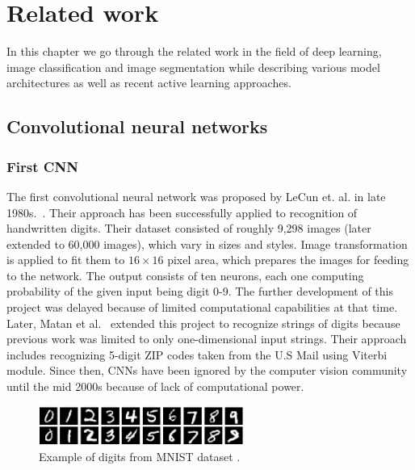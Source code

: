 \chapter{Related work}
\label{chapter:related_work}

In this chapter we go through the related work in the field of deep learning, image classification
and image segmentation while describing various model architectures as well as recent
active learning approaches.

\section{Convolutional neural networks}
\label{sec:cnn_rw}

\subsection{First CNN}
\label{sec:cnn_rw:lecun}

The first convolutional neural network was proposed by LeCun et.
al. in late 1980s.~\cite{bib:lecun1989backpropagation}. Their approach has been
successfully applied to recognition of handwritten digits. Their dataset \cite{bib:lecun2010mnist}
consisted of roughly 9,298 images (later extended to 60,000 images),
which vary in sizes and styles. Image transformation
is applied to fit them to $16\times16$ pixel area, which prepares the images for feeding to the
network. The output consists of ten neurons, each one computing probability
of the given input being digit 0-9. The further development of this project was delayed
because of limited computational capabilities at that time.
Later, Matan et al.~\cite{bib:matan1992multi} extended this project to recognize
strings of digits because previous work was limited to only one-dimensional
input strings. Their approach includes recognizing 5-digit ZIP codes taken from
the U.S Mail using Viterbi module.
Since then, CNNs have been ignored by the computer vision community until the mid 2000s
because of lack of computational power.

\begin{figure}[h]
	\centerline{\includegraphics[width=0.6\textwidth]{images/mnist_example.png}}
	\caption[Example of digits from MNIST dataset]{Example of digits from MNIST dataset \cite{bib:lecun2010mnist}.}
	\label{img:mnist_example}
\end{figure}

